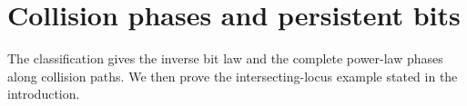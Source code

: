 \section{Collision phases and persistent bits}\label{sec:collision-phases}
The classification gives the inverse bit law and the complete power-law
phases along collision paths. We then prove the intersecting-locus
example stated in the introduction.






















